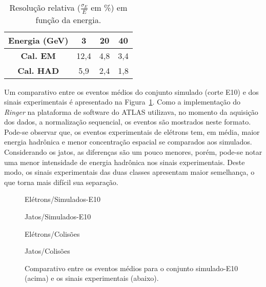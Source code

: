 \begin{table}[h!]
\centering \caption{Resolução relativa ($\frac{\sigma_E}{E}$ em \%) em função da energia.}\vspace{0.2cm} \footnotesize
\begin{tabular}{c|c|c|c}
    \hline
\textbf{Energia (GeV)} & \textbf{3} & \textbf{20} & \textbf{40} \\
\hline
\textbf{Cal. EM} & 12,4 & 4,8 & 3,4 \\
\textbf{Cal. HAD} & 5,9 & 2,4 & 1,8 \\
\hline
\end{tabular}
\label{tab_compTimeexpSeg}
\end{table}

Um comparativo entre os eventos médios do conjunto simulado (corte
E10) e dos sinais experimentais é apresentado na
Figura~\ref{fig_exp_compEvMed}. Como a implementação do
\emph{Ringer} na plataforma de software do ATLAS utilizava, no
momento da aquisição dos dados, a normalização sequencial, os
eventos são mostrados neste formato. Pode-se observar que, os
eventos experimentais de elétrons tem, em média, maior energia
hadrônica e menor concentração espacial se comparados aos
simulados. Considerando os jatos, as diferenças são um pouco
menores, porém, pode-se notar uma menor intensidade de energia
hadrônica nos sinais experimentais. Deste modo, os sinais
experimentais das duas classes apresentam maior semelhança, o que
torna mais difícil sua separação.

\begin{figure}[th]
\begin{minipage}[b]{0.48\linewidth}
  \centering
  \centerline{\footnotesize Elétrons/Simulados-E10}\medskip
 \centerline{}
\end{minipage}
\hfill
\begin{minipage}[b]{0.48\linewidth}
  \centering
  \centerline{\footnotesize Jatos/Simulados-E10}\medskip
 \centerline{}
\end{minipage}
\hfill \linebreak
\begin{minipage}[b]{0.48\linewidth}
  \centering
  \vspace{.4cm}
  \centerline{\footnotesize Elétrons/Colisões}\medskip
 \centerline{}
\end{minipage}
\hfill
\begin{minipage}[b]{0.48\linewidth}
  \centering
  \vspace{.4cm}
  \centerline{\footnotesize Jatos/Colisões}\medskip
 \centerline{}
\end{minipage}
\caption{Comparativo entre os eventos médios para o conjunto simulado-E10 (acima) e
os sinais experimentais (abaixo).}\label{fig_exp_compEvMed}
\end{figure}

